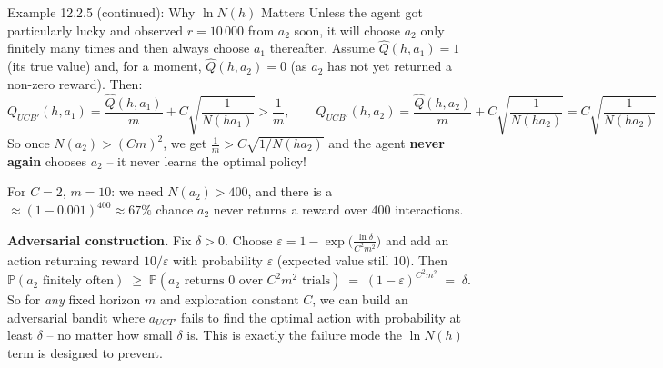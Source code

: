 \documentclass[aspectratio=169,10pt]{beamer}
\newcommand{\PP}{\mathbb{P}}
\begin{document}
\begin{frame}{Example 12.2.5 (continued): Why $\ln N(h)$ Matters}
\small
Unless the agent got particularly lucky and observed $r=10\,000$ from $a_2$ soon, it will
choose $a_2$ only finitely many times and then always choose $a_1$ thereafter. Assume
$\widehat Q(h,a_1)=1$ (its true value) and, for a moment, $\widehat Q(h,a_2)=0$ (as $a_2$
has not yet returned a non-zero reward). Then:
$$Q_{UCB'}(h,a_1) = \frac{\widehat Q(h,a_1)}{m}+C\sqrt{\frac{1}{N(ha_1)}} > \frac1m,
\qquad
Q_{UCB'}(h,a_2) = \frac{\widehat Q(h,a_2)}{m}+C\sqrt{\frac1{N(ha_2)}}=C\sqrt{\frac1{N(ha_2)}}$$
So once $N(a_2)>(Cm)^2$, we get $\frac1m>C\sqrt{1/N(ha_2)}$ and the agent \textbf{never
again} chooses $a_2$ -- it never learns the optimal policy!

For $C=2$, $m=10$: we need $N(a_2)>400$, and there is a $\approx(1-0.001)^{400}\approx
67\%$ chance $a_2$ never returns a reward over $400$ interactions.

\textbf{Adversarial construction.} Fix $\delta>0$. Choose
$\varepsilon=1-\exp\!\big(\frac{\ln\delta}{C^2m^2}\big)$ and add an action returning reward
$10/\varepsilon$ with probability $\varepsilon$ (expected value still $10$). Then
$$\PP(a_2\text{ finitely often}) \;\ge\; \PP(a_2\text{ returns } 0 \text{ over } C^2m^2
\text{ trials}) \;=\; (1-\varepsilon)^{C^2m^2} \;=\; \delta.$$
So for \emph{any} fixed horizon $m$ and exploration constant $C$, we can build an
adversarial bandit where $a_{UCT'}$ fails to find the optimal action with probability at
least $\delta$ -- no matter how small $\delta$ is. This is exactly the failure mode the
$\ln N(h)$ term is designed to prevent.
\end{frame}
\end{document}
